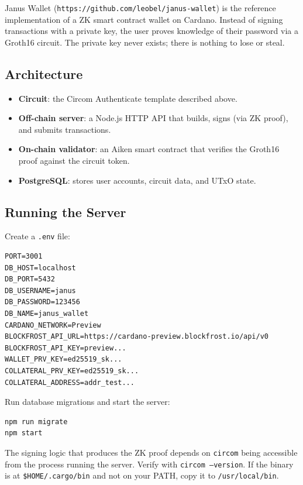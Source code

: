 Janus Wallet (\texttt{https://github.com/leobel/janus-wallet}) is the reference implementation of a ZK smart contract wallet on Cardano. Instead of signing transactions with a private key, the user proves knowledge of their password via a Groth16 circuit. The private key never exists; there is nothing to lose or steal.

\subsection*{Architecture}

\begin{itemize}
  \item \textbf{Circuit}: the Circom Authenticate template described above.
  \item \textbf{Off-chain server}: a Node.js HTTP API that builds, signs (via ZK proof), and submits transactions.
  \item \textbf{On-chain validator}: an Aiken smart contract that verifies the Groth16 proof against the circuit token.
  \item \textbf{PostgreSQL}: stores user accounts, circuit data, and UTxO state.
\end{itemize}

\subsection*{Running the Server}

Create a \texttt{.env} file:

\begin{verbatim}
PORT=3001
DB_HOST=localhost
DB_PORT=5432
DB_USERNAME=janus
DB_PASSWORD=123456
DB_NAME=janus_wallet
CARDANO_NETWORK=Preview
BLOCKFROST_API_URL=https://cardano-preview.blockfrost.io/api/v0
BLOCKFROST_API_KEY=preview...
WALLET_PRV_KEY=ed25519_sk...
COLLATERAL_PRV_KEY=ed25519_sk...
COLLATERAL_ADDRESS=addr_test...
\end{verbatim}

Run database migrations and start the server:

\begin{verbatim}
npm run migrate
npm start
\end{verbatim}

\begin{remark}
The signing logic that produces the ZK proof depends on \texttt{circom} being accessible from the process running the server. Verify with \texttt{circom --version}. If the binary is at \texttt{\$HOME/.cargo/bin} and not on your PATH, copy it to \texttt{/usr/local/bin}.
\end{remark}

